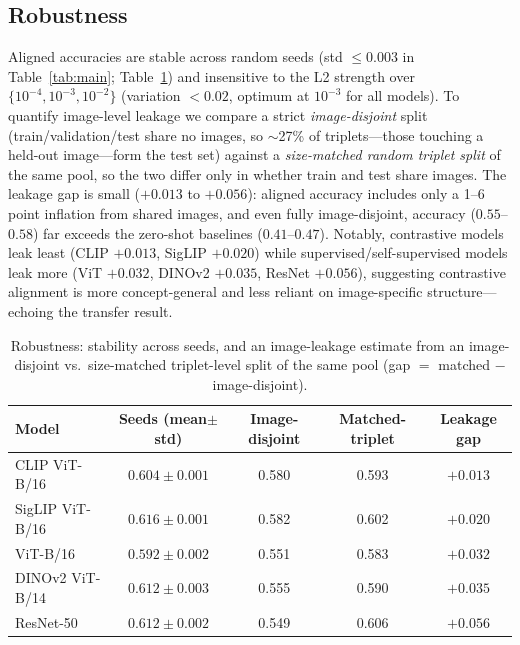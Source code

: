 \documentclass{article}
\begin{document}
\subsection{Robustness}
Aligned accuracies are stable across random seeds (std $\le 0.003$ in
Table~\ref{tab:main}; Table~\ref{tab:robust}) and insensitive to the L2 strength over
$\{10^{-4},10^{-3},10^{-2}\}$ (variation $<0.02$, optimum at $10^{-3}$ for all
models). To quantify image-level leakage we compare a strict \emph{image-disjoint}
split (train/validation/test share no images, so $\sim$27\% of triplets---those
touching a held-out image---form the test set) against a \emph{size-matched random
triplet split} of the same pool, so the two differ only in whether train and test
share images. The leakage gap is small ($+0.013$ to $+0.056$): aligned accuracy
includes only a 1--6 point inflation from shared images, and even fully
image-disjoint, accuracy ($0.55$--$0.58$) far exceeds the zero-shot baselines
($0.41$--$0.47$). Notably, contrastive models leak least (CLIP $+0.013$, SigLIP
$+0.020$) while supervised/self-supervised models leak more (ViT $+0.032$, DINOv2
$+0.035$, ResNet $+0.056$), suggesting contrastive alignment is more
concept-general and less reliant on image-specific structure---echoing the
transfer result.

\begin{table}[t]
\centering
\caption{Robustness: stability across seeds, and an image-leakage estimate from an
image-disjoint vs.\ size-matched triplet-level split of the same pool
(gap $=$ matched $-$ image-disjoint).}
\label{tab:robust}
\begin{tabular}{lcccc}
\toprule
Model & Seeds (mean$\pm$std) & Image-disjoint & Matched-triplet & Leakage gap \\
\midrule
CLIP ViT-B/16   & $0.604\pm0.001$ & 0.580 & 0.593 & $+0.013$ \\
SigLIP ViT-B/16 & $0.616\pm0.001$ & 0.582 & 0.602 & $+0.020$ \\
ViT-B/16        & $0.592\pm0.002$ & 0.551 & 0.583 & $+0.032$ \\
DINOv2 ViT-B/14 & $0.612\pm0.003$ & 0.555 & 0.590 & $+0.035$ \\
ResNet-50       & $0.612\pm0.002$ & 0.549 & 0.606 & $+0.056$ \\
\bottomrule
\end{tabular}
\end{table}
\end{document}
